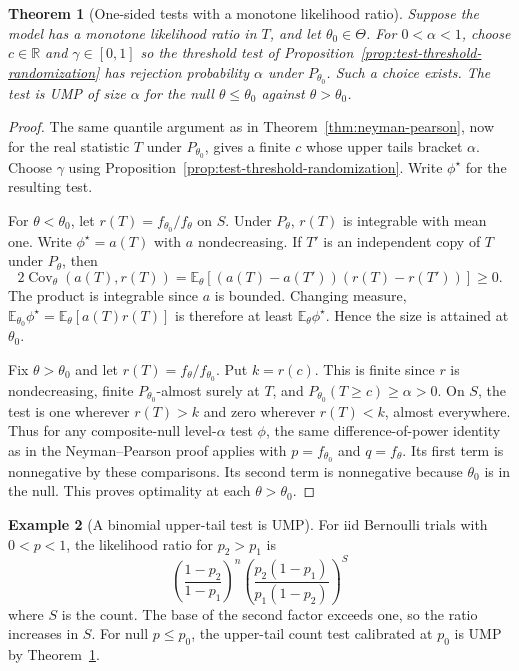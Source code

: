 \documentclass[11pt,oneside]{book}
\newtheorem{theorem}{Theorem}[chapter]
\theoremstyle{definition}
\newtheorem{example}[theorem]{Example}
\theoremstyle{remark}
\newcommand{\R}{\mathbb R}
\begin{document}
\begin{theorem}[One-sided tests with a monotone likelihood ratio]
\label{thm:ump-monotone-likelihood-ratio}
Suppose the model has a monotone likelihood ratio in $T$, and
let $\theta_0\in\Theta$. For $0<\alpha<1$, choose $c\in\R$ and
$\gamma\in[0,1]$ so the threshold test of
Proposition~\ref{prop:test-threshold-randomization} has rejection
probability $\alpha$ under $P_{\theta_0}$. Such a choice exists.
The test is UMP of size $\alpha$ for the null $\theta\leq\theta_0$
against $\theta>\theta_0$.
\end{theorem}
\begin{proof}
The same quantile argument as in Theorem~\ref{thm:neyman-pearson},
now for the real statistic $T$ under $P_{\theta_0}$, gives a finite
$c$ whose upper tails bracket $\alpha$. Choose $\gamma$ using
Proposition~\ref{prop:test-threshold-randomization}. Write $\phi^\star$
for the resulting test.

For $\theta<\theta_0$, let $r(T)=f_{\theta_0}/f_\theta$ on $S$.
Under $P_\theta$, $r(T)$ is integrable with mean one. Write
$\phi^\star=a(T)$ with $a$ nondecreasing. If $T'$ is an independent
copy of $T$ under $P_\theta$, then
\[
2\operatorname{Cov}_\theta(a(T),r(T))
=\mathbb E_\theta[(a(T)-a(T'))(r(T)-r(T'))]\geq0 .
\]
The product is integrable since $a$ is bounded. Changing
measure, $\mathbb E_{\theta_0}\phi^\star=\mathbb E_\theta[a(T)r(T)]$
is therefore at least $\mathbb E_\theta\phi^\star$. Hence the
size is attained at $\theta_0$.

Fix $\theta>\theta_0$ and let $r(T)=f_\theta/f_{\theta_0}$.
Put $k=r(c)$. This is finite since $r$ is nondecreasing,
finite $P_{\theta_0}$-almost surely at $T$, and
$P_{\theta_0}(T\geq c)\geq\alpha>0$. On $S$, the test is
one wherever $r(T)>k$ and zero wherever $r(T)<k$, almost
everywhere. Thus for any composite-null level-$\alpha$
test $\phi$, the same difference-of-power identity as in the
Neyman--Pearson proof applies with $p=f_{\theta_0}$ and
$q=f_\theta$. Its first term is nonnegative by these comparisons.
Its second term is nonnegative because $\theta_0$ is in the null.
This proves optimality at each $\theta>\theta_0$.
\end{proof}

\begin{example}[A binomial upper-tail test is UMP]
\label{ex:ump-binomial-upper-tail}
For iid Bernoulli trials with $0<p<1$, the likelihood ratio for
$p_2>p_1$ is
\[
\left(\frac{1-p_2}{1-p_1}\right)^n
\left(\frac{p_2(1-p_1)}{p_1(1-p_2)}\right)^S
\]
where $S$ is the count. The base of the second factor exceeds
one, so the ratio increases in $S$. For null $p\leq p_0$, the
upper-tail count test calibrated at $p_0$ is UMP by
Theorem~\ref{thm:ump-monotone-likelihood-ratio}.
\end{example}
\end{document}
